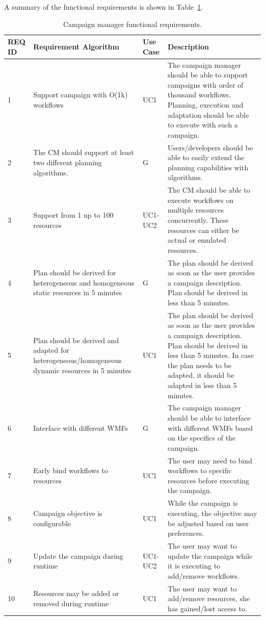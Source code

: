 A summary of the functional requirements is shown in Table~\ref{tab:fun_reqs}.

\begin{table}[t]
    \centering
    \scriptsize
    \begin{tabular}{@{}p{1.5cm}|p{2.8cm}p{1.5cm}p{6cm}@{}}
        \toprule
        \textbf{REQ ID} &\textbf{Requirement Algorithm} &\textbf{Use Case} & \textbf{Description} \\
        \midrule
         1 & 
         Support campaign with O(1k) workflows & 
         UC1 & 
         The campaign manager should be able to support campaigns with order of thousand workflows.
         Planning, execution and adaptation should be able to execute with such a campaign.\\
         2 & 
         The CM should support at least two different planning algorithms. & 
         G & 
         Users/developers should be able to easily extend the planning capabilities with algorithms.\\
         3 & 
         Support from 1 up to 100 resources & 
         UC1-UC2 & 
         The CM should be able to execute workflows on multiple resources concurrently.
         These resources can either be actual or emulated resources.\\
         4 & 
         Plan should be derived for heterogeneous and homogeneous static resources in 5 minutes & 
         G & 
         The plan should be derived as soon as the user provides a campaign description. 
         Plan should be derived in less than 5 minutes.\\
         5 & 
         Plan should be derived and adapted for heterogeneous/homogeneous dynamic resources in 5 minutes & 
         UC1 & 
         The plan should be derived as soon as the user provides a campaign description.
         Plan should be derived in less than 5 minutes.
         In case the plan needs to be adapted, it should be adapted in less than 5 minutes.\\
         6 & 
         Interface with different WMFs & 
         G & 
         The campaign manager should be able to interface with different WMFs based on the specifics of the campaign. \\
         7 & 
         Early bind workflows to resources &
         UC1 &
         The user may need to bind workflows to specific resources before executing the campaign.\\
         8 & 
         Campaign objective is configurable & 
         UC1 & 
         While the campaign is executing, the objective may be adjusted based on user preferences.\\
         9 &
         Update the campaign during runtime &
         UC1-UC2 &
         The user may want to update the campaign while it is executing to add/remove workflows.\\
         10 &
         Resources may be added or removed during runtime & 
         UC1 & 
         The user may want to add/remove resources, she has gained/lost access to.\\
        \bottomrule
    \end{tabular}
    \caption{Campaign manager functional requirements.\label{tab:fun_reqs}}
\end{table}

